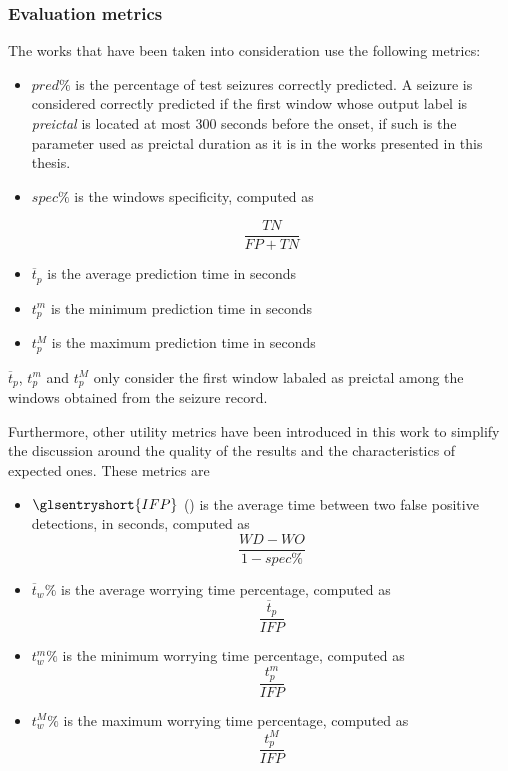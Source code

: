 \subsubsection{Evaluation metrics} \label{subsub:evaluation-metrics}

The works that have been taken into consideration use the following metrics:

\begin{itemize}
    \item $pred\%$ is the percentage of test seizures correctly predicted. A seizure is considered correctly predicted if the first window whose output label is \textit{preictal} is located at most 300 seconds before the onset, if such is the parameter used as preictal duration as it is in the works presented in this thesis.
    \item $spec\%$ is the windows specificity, computed as
    
        \begin{equation}
            \frac{TN}{FP+TN}
        \end{equation}
        
    \item $\overline{t}_p$ is the average prediction time in seconds
    \item $t_p^m$ is the minimum prediction time in seconds
    \item $t_p^M$ is the maximum prediction time in seconds
\end{itemize}

$\overline{t}_p$, $t_p^m$ and $t_p^M$ only consider the first window labaled as preictal among the windows obtained from the seizure record.

Furthermore, other utility metrics have been introduced in this work to simplify the discussion around the quality of the results and the characteristics of expected ones. These metrics are

\begin{itemize}
    \item $\glsentryshort{IFP}$ () is the average time between two false positive detections, in seconds, computed as
        \begin{equation}
            \frac{WD - WO}{1 - spec\%}
        \end{equation}
    \item $\overline{t}_w\%$ is the average worrying time percentage, computed as
        \begin{equation}
            \frac{\overline{t}_p}{IFP}
        \end{equation}    
    \item $t_w^m\%$ is the minimum worrying time percentage, computed as
        \begin{equation}
            \frac{t_p^m}{IFP}
        \end{equation}
    \item $t_w^M\%$ is the maximum worrying time percentage, computed as
        \begin{equation}
            \frac{t_p^M}{IFP}
        \end{equation}
\end{itemize}


